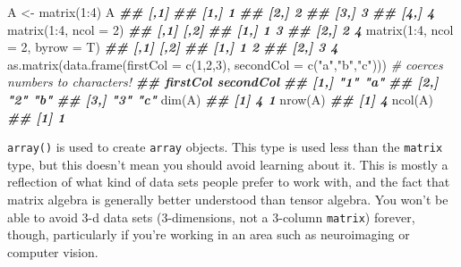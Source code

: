 \documentclass[
  12pt,
  krantz2]{krantz}
\makeatletter
\newenvironment{Shaded}{\begin{snugshade}}{\end{snugshade}}
\newcommand{\AttributeTok}[1]{\textcolor[rgb]{0.61,0.61,0.61}{#1}}
\newcommand{\CommentTok}[1]{\textcolor[rgb]{0.37,0.37,0.37}{\textit{#1}}}
\newcommand{\DecValTok}[1]{\textcolor[rgb]{0.06,0.06,0.06}{#1}}
\newcommand{\DocumentationTok}[1]{\textcolor[rgb]{0.37,0.37,0.37}{\textbf{\textit{#1}}}}
\newcommand{\FunctionTok}[1]{\textcolor[rgb]{0,0,0}{#1}}
\newcommand{\NormalTok}[1]{#1}
\newcommand{\OtherTok}[1]{\textcolor[rgb]{0.37,0.37,0.37}{#1}}
\newcommand{\SpecialCharTok}[1]{\textcolor[rgb]{0,0,0}{#1}}
\newcommand{\StringTok}[1]{\textcolor[rgb]{0.5,0.5,0.5}{#1}}
\newenvironment{kframe}{%
\medskip{}
\setlength{\fboxsep}{.8em}
 \def\at@end@of@kframe{}%
 \ifinner\ifhmode%
  \def\at@end@of@kframe{\end{minipage}}%
  \begin{minipage}{\columnwidth}%
 \fi\fi%
 \def\FrameCommand##1{\hskip\@totalleftmargin \hskip-\fboxsep
 \colorbox{shadecolor}{##1}\hskip-\fboxsep
     \hskip-\linewidth \hskip-\@totalleftmargin \hskip\columnwidth}%
 \MakeFramed {\advance\hsize-\width
   \@totalleftmargin\z@ \linewidth\hsize
   \@setminipage}}%
 {\par\unskip\endMakeFramed%
 \at@end@of@kframe}
\renewenvironment{Shaded}{\begin{kframe}}{\end{kframe}}
\makeatother
\begin{document}
\begin{Shaded}
\begin{Highlighting}[]
\NormalTok{A }\OtherTok{\textless{}{-}} \FunctionTok{matrix}\NormalTok{(}\DecValTok{1}\SpecialCharTok{:}\DecValTok{4}\NormalTok{)}
\NormalTok{A}
\DocumentationTok{\#\#      [,1]}
\DocumentationTok{\#\# [1,]    1}
\DocumentationTok{\#\# [2,]    2}
\DocumentationTok{\#\# [3,]    3}
\DocumentationTok{\#\# [4,]    4}
\FunctionTok{matrix}\NormalTok{(}\DecValTok{1}\SpecialCharTok{:}\DecValTok{4}\NormalTok{, }\AttributeTok{ncol =} \DecValTok{2}\NormalTok{)}
\DocumentationTok{\#\#      [,1] [,2]}
\DocumentationTok{\#\# [1,]    1    3}
\DocumentationTok{\#\# [2,]    2    4}
\FunctionTok{matrix}\NormalTok{(}\DecValTok{1}\SpecialCharTok{:}\DecValTok{4}\NormalTok{, }\AttributeTok{ncol =} \DecValTok{2}\NormalTok{, }\AttributeTok{byrow =}\NormalTok{ T)}
\DocumentationTok{\#\#      [,1] [,2]}
\DocumentationTok{\#\# [1,]    1    2}
\DocumentationTok{\#\# [2,]    3    4}
\FunctionTok{as.matrix}\NormalTok{(}\FunctionTok{data.frame}\NormalTok{(}\AttributeTok{firstCol =} \FunctionTok{c}\NormalTok{(}\DecValTok{1}\NormalTok{,}\DecValTok{2}\NormalTok{,}\DecValTok{3}\NormalTok{), }\AttributeTok{secondCol =} \FunctionTok{c}\NormalTok{(}\StringTok{"a"}\NormalTok{,}\StringTok{"b"}\NormalTok{,}\StringTok{"c"}\NormalTok{))) }\CommentTok{\# coerces numbers to characters!}
\DocumentationTok{\#\#      firstCol secondCol}
\DocumentationTok{\#\# [1,] "1"      "a"      }
\DocumentationTok{\#\# [2,] "2"      "b"      }
\DocumentationTok{\#\# [3,] "3"      "c"}
\FunctionTok{dim}\NormalTok{(A)}
\DocumentationTok{\#\# [1] 4 1}
\FunctionTok{nrow}\NormalTok{(A)}
\DocumentationTok{\#\# [1] 4}
\FunctionTok{ncol}\NormalTok{(A)}
\DocumentationTok{\#\# [1] 1}
\end{Highlighting}
\end{Shaded}

\texttt{array()} is used to create \texttt{array} objects. This type is used less than the \texttt{matrix} type, but this doesn't mean you should avoid learning about it. This is mostly a reflection of what kind of data sets people prefer to work with, and the fact that matrix algebra is generally better understood than tensor algebra. You won't be able to avoid 3-d data sets (3-dimensions, not a 3-column \texttt{matrix}) forever, though, particularly if you're working in an area such as neuroimaging or computer vision.
\end{document}
